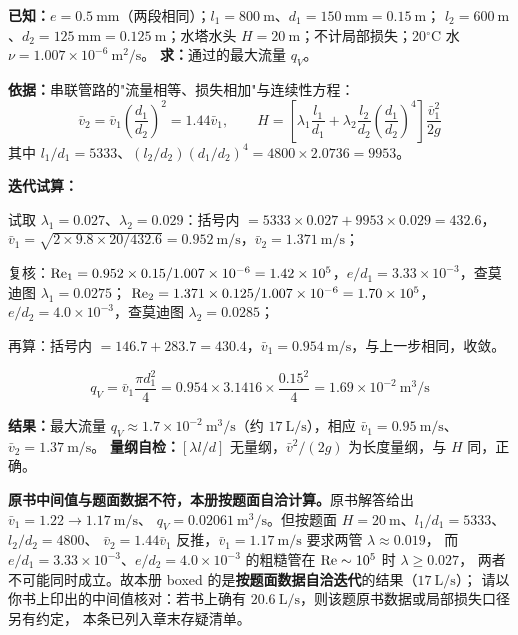 \begin{jie}
\textbf{已知：}$e=0.5\ \mathrm{mm}$（两段相同）；$l_1=800\ \mathrm{m}$、$d_1=150\ \mathrm{mm}=0.15\ \mathrm{m}$；
$l_2=600\ \mathrm{m}$、$d_2=125\ \mathrm{mm}=0.125\ \mathrm{m}$；水塔水头 $H=20\ \mathrm{m}$；不计局部损失；20$^\circ$C 水 $\nu=1.007\times10^{-6}\ \mathrm{m^2/s}$。
\textbf{求：}通过的最大流量 $q_V$。

\textbf{依据：}串联管路的"流量相等、损失相加"与连续性方程：
\[ \bar v_2=\bar v_1\left(\frac{d_1}{d_2}\right)^2=1.44\bar v_1,\qquad
H=\left[\lambda_1\frac{l_1}{d_1}+\lambda_2\frac{l_2}{d_2}\left(\frac{d_1}{d_2}\right)^4\right]\frac{\bar v_1^2}{2g} \]
其中 $l_1/d_1=5333$、$(l_2/d_2)(d_1/d_2)^4=4800\times2.0736=9953$。

\textbf{迭代试算：}
\begin{xiaowen}
\item 试取 $\lambda_1=0.027$、$\lambda_2=0.029$：括号内 $=5333\times0.027+9953\times0.029=432.6$，
$\bar v_1=\sqrt{2\times9.8\times20/432.6}=0.952\ \mathrm{m/s}$，$\bar v_2=1.371\ \mathrm{m/s}$；
\item 复核：$\mathrm{Re}_1=0.952\times0.15/1.007\times10^{-6}=1.42\times10^5$，$e/d_1=3.33\times10^{-3}$，查莫迪图 $\lambda_1=0.0275$；
$\mathrm{Re}_2=1.371\times0.125/1.007\times10^{-6}=1.70\times10^5$，$e/d_2=4.0\times10^{-3}$，查莫迪图 $\lambda_2=0.0285$；
\item 再算：括号内 $=146.7+283.7=430.4$，$\bar v_1=0.954\ \mathrm{m/s}$，与上一步相同，收敛。
\end{xiaowen}
\[ q_V=\bar v_1\frac{\pi d_1^2}{4}=0.954\times3.1416\times\frac{0.15^2}{4}=1.69\times10^{-2}\ \mathrm{m^3/s} \]

\textbf{结果：}最大流量 $q_V\approx1.7\times10^{-2}\ \mathrm{m^3/s}$（约 $17\ \mathrm{L/s}$），相应 $\bar v_1=0.95\ \mathrm{m/s}$、$\bar v_2=1.37\ \mathrm{m/s}$。
\textbf{量纲自检：}$[\lambda l/d]$ 无量纲，$\bar v^2/(2g)$ 为长度量纲，与 $H$ 同，正确。
\end{jie}

\begin{tishi}
\textbf{原书中间值与题面数据不符，本册按题面自洽计算。}原书解答给出 $\bar v_1=1.22\to1.17\ \mathrm{m/s}$、
$q_V=0.02061\ \mathrm{m^3/s}$。但按题面 $H=20\ \mathrm{m}$、$l_1/d_1=5333$、$l_2/d_2=4800$、
$\bar v_2=1.44\bar v_1$ 反推，$\bar v_1=1.17\ \mathrm{m/s}$ 要求两管 $\lambda\approx0.019$，
而 $e/d_1=3.33\times10^{-3}$、$e/d_2=4.0\times10^{-3}$ 的粗糙管在 $\mathrm{Re}\sim10^5$ 时 $\lambda\ge0.027$，
两者不可能同时成立。故本册 boxed 的是\textbf{按题面数据自洽迭代}的结果（$17\ \mathrm{L/s}$）；
请以你书上印出的中间值核对：若书上确有 $20.6\ \mathrm{L/s}$，则该题原书数据或局部损失口径另有约定，
本条已列入章末存疑清单。
\end{tishi}

